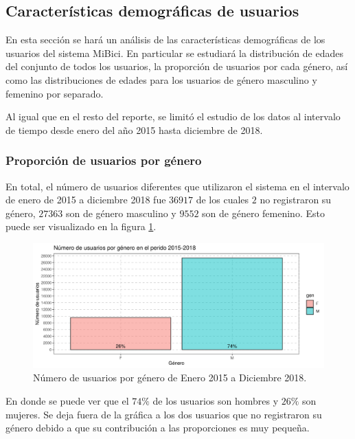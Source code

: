 \subsection{Características demográficas de usuarios}
En esta sección se hará un análisis de las características demográficas de los usuarios del sistema MiBici. En particular se estudiará la distribución de edades del conjunto de todos los usuarios, la proporción de usuarios por cada género, así como las distribuciones de edades para los usuarios de género masculino y femenino por separado.
\par Al igual que en el resto del reporte, se limitó el estudio de los datos al intervalo de tiempo desde enero del año 2015 hasta diciembre de 2018.
\subsubsection{Proporción de usuarios por género}
En total, el número de usuarios diferentes que utilizaron el sistema en el intervalo de enero de 2015 a diciembre 2018 fue $36917$ de los cuales $2$ no registraron su género, $27363$ son de género masculino y $9552$ son de género femenino. Esto puede ser visualizado en la figura \ref{fig:genderprop}.
\begin{figure}[H]
	\centering
	\includegraphics[width=14cm]{Graphics/genderProp}
	\caption{Número de usuarios por género de Enero 2015 a Diciembre 2018.}
	\label{fig:genderprop}
\end{figure}
En donde se puede ver que el $74\%$ de los usuarios son hombres y $26\%$ son mujeres. Se deja fuera de la gráfica a los dos usuarios que no registraron su género debido a que su contribución a las proporciones es muy pequeña.
